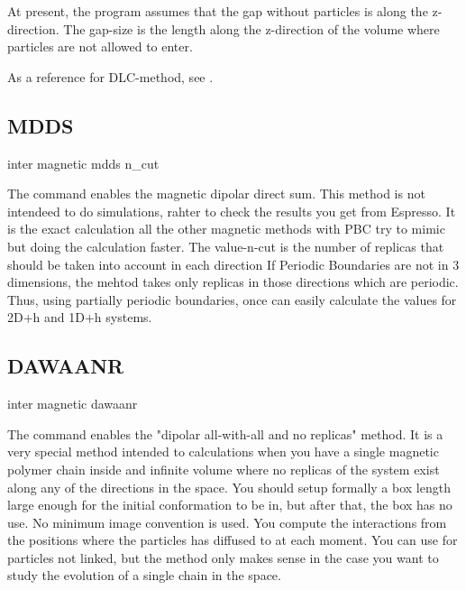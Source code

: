 At present, the program assumes that the gap without particles is
along the z-direction.  The gap-size is the length along the
z-direction of the volume where particles are not allowed to enter.

As a reference for DLC-method, see \cite{brodka04a}.

\subsection{MDDS}

\begin{essyntax}
  inter magnetic  mdds n\_cut 
  \begin{features}
  \end{features}
\end{essyntax}
The command enables the magnetic dipolar direct sum. This method is
not intendeed to do simulations, rahter to check the results you get
from Espresso. It is the exact calculation all the other magnetic
methods with PBC try to mimic but doing the calculation faster.  The
value-n-cut is the number of replicas that should be taken into
account in each direction If Periodic Boundaries are not in 3
dimensions, the mehtod takes only replicas in those directions which
are periodic. Thus, using partially periodic boundaries, once can
easily calculate the values for 2D+h and 1D+h systems.
  
\subsection{DAWAANR}

\begin{essyntax}
  inter magnetic  dawaanr
  \begin{features}
  \end{features}
\end{essyntax}
The command enables the "dipolar all-with-all and no replicas"
method. It is a very special method intended to calculations when you
have a single magnetic polymer chain inside and infinite volume where
no replicas of the system exist along any of the directions in the
space.  You should setup formally a box length large enough for the
initial conformation to be in, but after that, the box has no use.  No
minimum image convention is used. You compute the interactions from
the positions where the particles has diffused to at each moment. You
can use for particles not linked, but the method only makes sense in
the case you want to study the evolution of a single chain in the
space.

